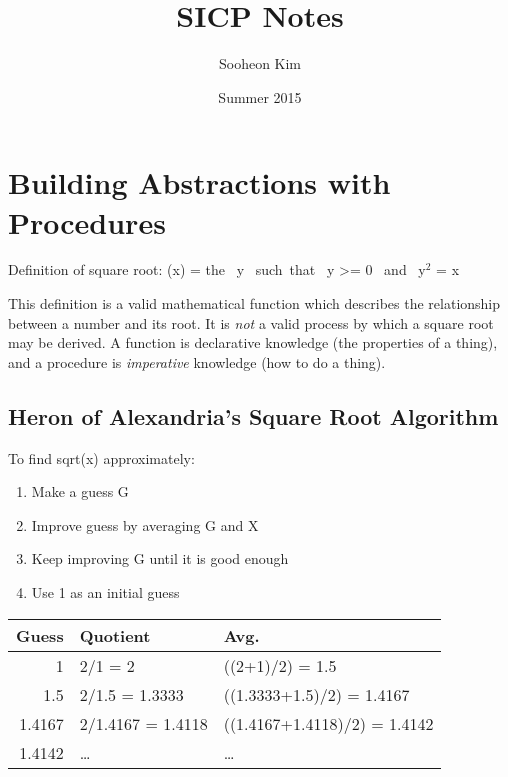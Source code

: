 \documentclass[11pt]{article}
\author{Sooheon Kim}
\date{Summer 2015}
\title{SICP Notes}
\begin{document}
\maketitle
\tableofcontents


\section{Building Abstractions with Procedures}
\label{sec-1}
Definition of square root:
\sqrt(x) = \mbox{the } y \mbox{ such that } y >= 0 \mbox{ and } y$^{\text{2}}$ = x

This definition is a valid mathematical function which describes the relationship between a number and its root. It is \emph{not} a valid process by which a square root may be derived. A function is declarative knowledge (the properties of a thing), and a procedure is \emph{imperative} knowledge (how to do a thing).

\subsection{Heron of Alexandria's Square Root Algorithm}
\label{sec-1-1}
To find sqrt(x) approximately:
\begin{enumerate}
\item Make a guess G
\item Improve guess by averaging G and X
\item Keep improving G until it is good enough
\item Use 1 as an initial guess
\end{enumerate}

\begin{center}
\begin{tabular}{rll}
Guess & Quotient & Avg.\\
\hline
1 & 2/1 = 2 & ((2+1)/2) = 1.5\\
1.5 & 2/1.5 = 1.3333 & ((1.3333+1.5)/2) = 1.4167\\
1.4167 & 2/1.4167 = 1.4118 & ((1.4167+1.4118)/2) = 1.4142\\
1.4142 & \ldots{} & \ldots{}\\
\end{tabular}
\end{center}
\end{document}
